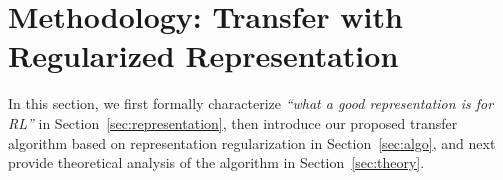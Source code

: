 \section{Methodology: Transfer with Regularized Representation}
\label{sec:method}

In this section, we first formally characterize \textit{``what a good representation is for RL''} in Section~\ref{sec:representation}, then introduce our proposed transfer algorithm based on representation regularization  in Section~\ref{sec:algo}, and next provide theoretical analysis of the algorithm in Section~\ref{sec:theory}.


